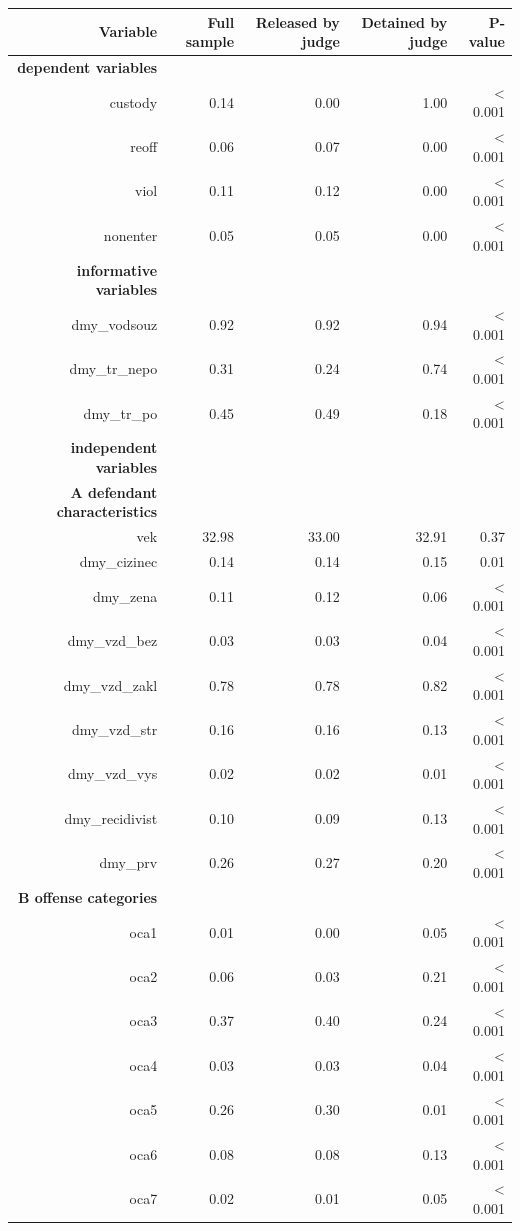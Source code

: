 \documentclass[12pt, twoside,openany]{book} %
\begin{document}
\begin{table}[H]
\centering
\begin{tabular}{rrrrr}
  \hline
Variable & Full sample & Released by judge & Detained by judge & P-value \\ 
  \hline
  \textbf{dependent variables}&&&&\\
  custody & 0.14 & 0.00 & 1.00 & < 0.001 \\ 
  reoff & 0.06 & 0.07 & 0.00 & < 0.001 \\ 
  viol & 0.11 & 0.12 & 0.00 & < 0.001 \\ 
  nonenter & 0.05 & 0.05 & 0.00 & < 0.001 \\ 
 \textbf{informative variables}&&&&\\  
dmy\_vodsouz & 0.92 & 0.92 & 0.94 & < 0.001 \\ 
  dmy\_tr\_nepo & 0.31 & 0.24 & 0.74 & < 0.001 \\ 
  dmy\_tr\_po & 0.45 & 0.49 & 0.18 & < 0.001 \\ 
 \textbf{independent variables}&&&&\\  
 \textbf{A defendant characteristics}&&&&\\
vek & 32.98 & 33.00 & 32.91 & 0.37 \\ 
  dmy\_cizinec & 0.14 & 0.14 & 0.15 & 0.01 \\ 
  dmy\_zena & 0.11 & 0.12 & 0.06 & < 0.001 \\ 
  dmy\_vzd\_bez & 0.03 & 0.03 & 0.04 & < 0.001 \\ 
  dmy\_vzd\_zakl & 0.78 & 0.78 & 0.82 & < 0.001 \\ 
  dmy\_vzd\_str & 0.16 & 0.16 & 0.13 & < 0.001 \\ 
  dmy\_vzd\_vys & 0.02 & 0.02 & 0.01 & < 0.001 \\ 
  dmy\_recidivist & 0.10 & 0.09 & 0.13 & < 0.001 \\ 
  dmy\_prv & 0.26 & 0.27 & 0.20 & < 0.001 \\ 
  \textbf{B offense categories}&&&&\\
\hspace{1cm}oca1 & 0.01 & 0.00 & 0.05 & < 0.001 \\ 
  \hspace{1cm}oca2 & 0.06 & 0.03 & 0.21 & < 0.001 \\ 
  \hspace{1cm}oca3 & 0.37 & 0.40 & 0.24 & < 0.001 \\ 
  \hspace{1cm}oca4 & 0.03 & 0.03 & 0.04 & < 0.001 \\ 
  \hspace{1cm}oca5 & 0.26 & 0.30 & 0.01 & < 0.001 \\ 
  \hspace{1cm}oca6 & 0.08 & 0.08 & 0.13 & < 0.001 \\ 
  \hspace{1cm}oca7 & 0.02 & 0.01 & 0.05 & < 0.001 \\ 
   \hline
\end{tabular}


\end{table}
\end{document}
